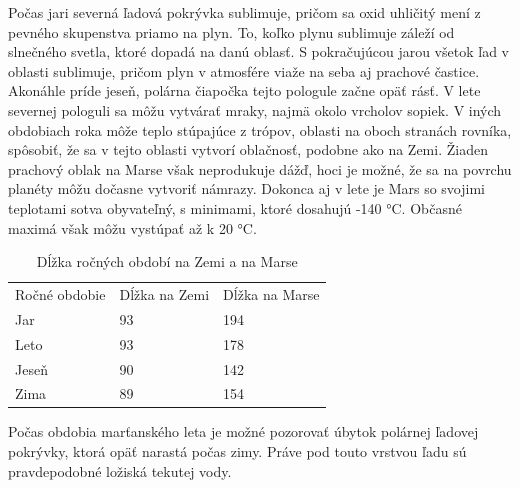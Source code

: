 \newline Počas jari severná ľadová pokrývka sublimuje, pričom sa oxid uhličitý mení z pevného skupenstva priamo na plyn. To, koľko plynu sublimuje záleží od slnečného svetla, ktoré dopadá na danú oblasť. S pokračujúcou jarou všetok ľad v oblasti sublimuje, pričom plyn v atmosfére viaže na seba aj prachové častice. Akonáhle príde jeseň, polárna čiapočka tejto pologule začne opäť rásť. V lete severnej pologuli sa môžu vytvárať mraky, najmä okolo vrcholov sopiek. V iných obdobiach roka môže teplo stúpajúce z trópov, oblasti na oboch stranách rovníka, spôsobiť, že sa v tejto oblasti vytvorí oblačnosť, podobne ako na Zemi. Žiaden prachový oblak na Marse však neprodukuje dážď, hoci je možné, že sa na povrchu planéty môžu dočasne vytvoriť námrazy. Dokonca aj v lete je Mars so svojimi teplotami sotva obyvateľný, s minimami, ktoré dosahujú -140 °C. Občasné maximá však môžu vystúpať až k 20 °C.

\begin{table}[!htbp]
\caption{Dĺžka ročných období na Zemi a na Marse}
\centering
\begin{tabular}{lll}
Ročné obdobie & Dĺžka na Zemi & Dĺžka na Marse  \\
Jar           & 93            & 194             \\
Leto          & 93            & 178             \\
Jeseň         & 90            & 142             \\
Zima          & 89            & 154            
\end{tabular}
\end{table}
Počas obdobia marťanského leta je možné pozorovať úbytok polárnej ľadovej pokrývky, ktorá opäť narastá počas zimy. Práve pod touto vrstvou ľadu sú pravdepodobné ložiská tekutej vody.

